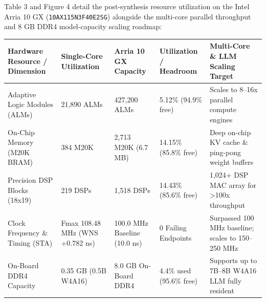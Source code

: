 \documentclass[11pt,a4paper]{article}
\begin{document}
Table 3 and Figure 4 detail the post-synthesis resource utilization on the Intel Arria 10 GX (\texttt{10AX115N3F40E2SG}) alongside the multi-core parallel throughput and 8 GB DDR4 model-capacity scaling roadmap:

{\footnotesize\renewcommand{\arraystretch}{1.14}\begin{longtable}{@{}L{0.21\textwidth}L{0.16\textwidth}L{0.16\textwidth}L{0.15\textwidth}L{0.22\textwidth}@{}}\toprule

\textbf{Hardware Resource /\allowbreak{} Dimension} & \textbf{Single-Core Utilization} & \textbf{Arria 10 GX Capacity} & \textbf{Utilization /\allowbreak{} Headroom} & \textbf{Multi-Core \& LLM Scaling Target}\\\midrule\endhead

Adaptive Logic Modules (\allowbreak{}ALMs)\allowbreak{} & 21,\allowbreak{}890 ALMs & 427,\allowbreak{}200 ALMs & 5.12\% (\allowbreak{}94.9\% free)\allowbreak{} & Scales to 8--16x parallel compute engines\\[2pt]

On-Chip Memory (\allowbreak{}M20K BRAM)\allowbreak{} & 384 M20K & 2,\allowbreak{}713 M20K (\allowbreak{}6.7 MB)\allowbreak{} & 14.15\% (\allowbreak{}85.8\% free)\allowbreak{} & Deep on-chip KV cache \& ping-pong weight buffers\\[2pt]

Precision DSP Blocks (\allowbreak{}18x19)\allowbreak{} & 219 DSPs & 1,\allowbreak{}518 DSPs & 14.43\% (\allowbreak{}85.6\% free)\allowbreak{} & 1,\allowbreak{}024+\allowbreak{} DSP MAC array for >100x throughput\\[2pt]

Clock Frequency \& Timing (\allowbreak{}STA)\allowbreak{} & Fmax 108.48 MHz (\allowbreak{}WNS +\allowbreak{}0.782 ns)\allowbreak{} & 100.0 MHz Baseline (\allowbreak{}10.0 ns)\allowbreak{} & 0 Failing Endpoints & Surpassed 100 MHz baseline; scales to 150--250 MHz\\[2pt]

On-Board DDR4 Capacity & 0.35 GB (\allowbreak{}0.5B W4A16)\allowbreak{} & 8.0 GB On-Board DDR4 & 4.4\% used (\allowbreak{}95.6\% free)\allowbreak{} & Supports up to 7B--8B W4A16 LLM fully resident\\[2pt]

\bottomrule\end{longtable}}
\end{document}
